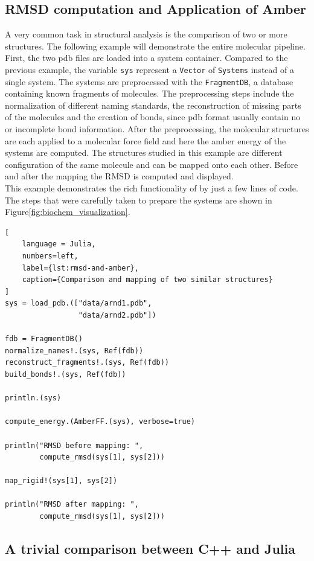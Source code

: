\subsection{RMSD computation and Application of Amber}

A very common task in structural analysis is the comparison of two or more structures. The following example will demonstrate the entire molecular pipeline. First, the two pdb files are loaded into a system container. Compared to the previous example, the variable \texttt{sys} represent a \texttt{Vector} of \texttt{Systems} instead of a single system. The systems are preprocessed with the \texttt{FragmentDB}, a database containing known fragments of molecules. The preprocessing steps include the normalization of different naming standards, the reconstruction of missing parts of the molecules and the creation of bonds, since pdb format usually contain no or incomplete bond information.  After the preprocessing, the molecular structures are each applied to a molecular force field and here the amber energy of the systems are computed. The structures studied in this example are different configuration of the same molecule and can be mapped onto each other. Before and after the mapping the RMSD is computed and displayed.  \\
This example demonstrates the rich functionality of \biochem by just a few lines of code. The steps that were carefully taken to prepare the systems are shown in Figure\ref{fig:biochem_visualization}.
\begin{lstlisting}[
    language = Julia, 
    numbers=left, 
    label={lst:rmsd-and-amber}, 
    caption={Comparison and mapping of two similar structures}
]
sys = load_pdb.(["data/arnd1.pdb", 
				 "data/arnd2.pdb"])

fdb = FragmentDB()
normalize_names!.(sys, Ref(fdb))
reconstruct_fragments!.(sys, Ref(fdb))
build_bonds!.(sys, Ref(fdb))

println.(sys)

compute_energy.(AmberFF.(sys), verbose=true)

println("RMSD before mapping: ", 
		compute_rmsd(sys[1], sys[2]))

map_rigid!(sys[1], sys[2])

println("RMSD after mapping: ", 
		compute_rmsd(sys[1], sys[2]))
\end{lstlisting}

\subsection{A trivial comparison between C++ and Julia}

